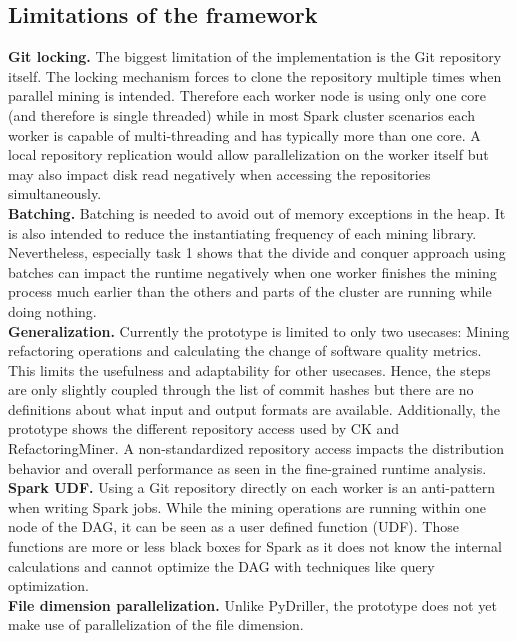 \subsection{Limitations of the framework}
\textbf{Git locking.} The biggest limitation of the \iris implementation is the Git repository itself. The locking mechanism forces to clone the repository multiple times when parallel mining is intended. Therefore each worker node is using only one core (and therefore is single threaded) while in most Spark cluster scenarios each worker is capable of multi-threading and has typically more than one core. A local repository replication would allow parallelization on the worker itself but may also impact disk read negatively when accessing the repositories simultaneously. \\
\textbf{Batching.} Batching is needed to avoid out of memory exceptions in the heap. It is also intended to reduce the instantiating frequency of each mining library. Nevertheless, especially task 1 shows that the divide and conquer approach using batches can impact the runtime negatively when one worker finishes the mining process much earlier than the others and parts of the cluster are running while doing nothing.\\
\textbf{Generalization.} Currently the prototype is limited to only two usecases: Mining refactoring operations and calculating the change of software quality metrics. This limits the usefulness and adaptability for other usecases. Hence, the steps are only slightly coupled through the list of commit hashes but there are no definitions about what input and output formats are available. Additionally, the prototype shows the different repository access used by CK and RefactoringMiner. A non-standardized repository access impacts the distribution behavior and overall performance as seen in the fine-grained runtime analysis.\\
\textbf{Spark UDF.} Using a Git repository directly on each worker is an anti-pattern when writing Spark jobs. While the mining operations are running within one node of the DAG, it can be seen as a user defined function (UDF). Those functions are more or less black boxes for Spark as it does not know the internal calculations and cannot optimize the DAG with techniques like query optimization.\\
\textbf{File dimension parallelization.} Unlike PyDriller, the prototype does not yet make use of parallelization of the file dimension.
\label{sec:limitations}
